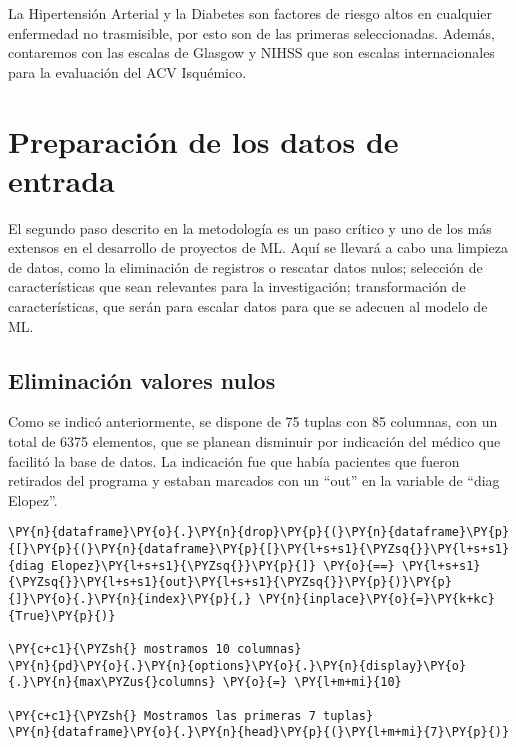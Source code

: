     La Hipertensión Arterial y la Diabetes son factores de riesgo altos en cualquier enfermedad no trasmisible, por esto son de las primeras seleccionadas. Además, contaremos con las escalas de Glasgow y NIHSS que son escalas internacionales para la evaluación del ACV Isquémico.

    \hypertarget{preparaciuxf3n-de-los-datos-de-entrada}{%
\section{Preparación de los datos de
entrada}\label{preparaciuxf3n-de-los-datos-de-entrada}}

El segundo paso descrito en la metodología  es un paso crítico y uno de los más extensos en el desarrollo de proyectos de ML. Aquí se llevará a cabo una limpieza de datos, como la eliminación de registros o rescatar datos nulos; selección de características que sean relevantes para la investigación; transformación de características, que serán para escalar datos para que se adecuen al modelo de ML.

    \hypertarget{eliminaciuxf3n-las-filas-de-los-pacientes-que-se-expulsaron-de-la-bdd}{%
\subsection{Eliminación valores nulos}\label{eliminaciuxf3n-las-filas-de-los-pacientes-que-se-expulsaron-de-la-bdd}}

Como se indicó anteriormente, se dispone de 75 tuplas con 85 columnas, con un total de 6375 elementos, que se planean disminuir por indicación del médico que facilitó la base de datos. La indicación fue que había pacientes que fueron retirados del programa y estaban marcados con un ``out'' en la variable de ``diag Elopez''.

    \begin{tcolorbox}[breakable, size=fbox, boxrule=1pt, pad at break*=1mm,colback=cellbackground, colframe=cellborder]
\begin{Verbatim}[commandchars=\\\{\}]
\PY{n}{dataframe}\PY{o}{.}\PY{n}{drop}\PY{p}{(}\PY{n}{dataframe}\PY{p}{[}\PY{p}{(}\PY{n}{dataframe}\PY{p}{[}\PY{l+s+s1}{\PYZsq{}}\PY{l+s+s1}{diag Elopez}\PY{l+s+s1}{\PYZsq{}}\PY{p}{]} \PY{o}{==} \PY{l+s+s1}{\PYZsq{}}\PY{l+s+s1}{out}\PY{l+s+s1}{\PYZsq{}}\PY{p}{)}\PY{p}{]}\PY{o}{.}\PY{n}{index}\PY{p}{,} \PY{n}{inplace}\PY{o}{=}\PY{k+kc}{True}\PY{p}{)}

\PY{c+c1}{\PYZsh{} mostramos 10 columnas}
\PY{n}{pd}\PY{o}{.}\PY{n}{options}\PY{o}{.}\PY{n}{display}\PY{o}{.}\PY{n}{max\PYZus{}columns} \PY{o}{=} \PY{l+m+mi}{10}

\PY{c+c1}{\PYZsh{} Mostramos las primeras 7 tuplas}
\PY{n}{dataframe}\PY{o}{.}\PY{n}{head}\PY{p}{(}\PY{l+m+mi}{7}\PY{p}{)}
\end{Verbatim}
\end{tcolorbox}

